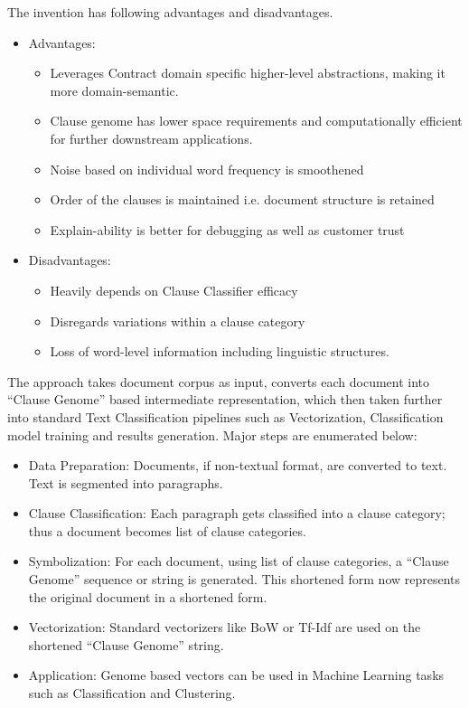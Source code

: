 \documentclass[english]{uspatent}
\begin{document}
\patentParagraph The invention has following advantages and disadvantages.

 \begin{itemize}
 \item Advantages:
  \begin{itemize}
\item Leverages Contract domain specific higher-level abstractions, making it more domain-semantic.
\item Clause genome has lower space requirements and computationally efficient for further downstream applications.
\item Noise based on individual word frequency is smoothened
\item Order of the clauses is maintained i.e. document structure is retained
\item Explain-ability is better for debugging as well as customer trust
\end{itemize}
\item Disadvantages:
 \begin{itemize}
\item Heavily depends on Clause Classifier efficacy
\item Disregards variations within a clause category
\item Loss of word-level information including linguistic structures.
\end{itemize}
\end{itemize}

\patentDrawingDescriptions


\patentParagraph The approach takes document corpus as input, converts each document into ``Clause Genome'' based intermediate representation, which then taken further into standard Text Classification pipelines such as Vectorization, Classification model training and results generation. Major steps are enumerated below:

 \begin{itemize}
 \item Data Preparation: Documents, if non-textual format, are converted to text. Text is segmented into paragraphs.
  \item Clause Classification: Each paragraph gets classified into a clause category; thus a document becomes list of clause categories.
\item Symbolization: For each document, using list of clause categories, a ``Clause Genome'' sequence or string is generated. This shortened form now represents the original document in a shortened form.
\item Vectorization: Standard vectorizers like BoW or Tf-Idf are used on the shortened ``Clause Genome'' string.
\item Application: Genome based vectors can be used in Machine Learning tasks such as Classification and Clustering.
 \end{itemize}
\end{document}
